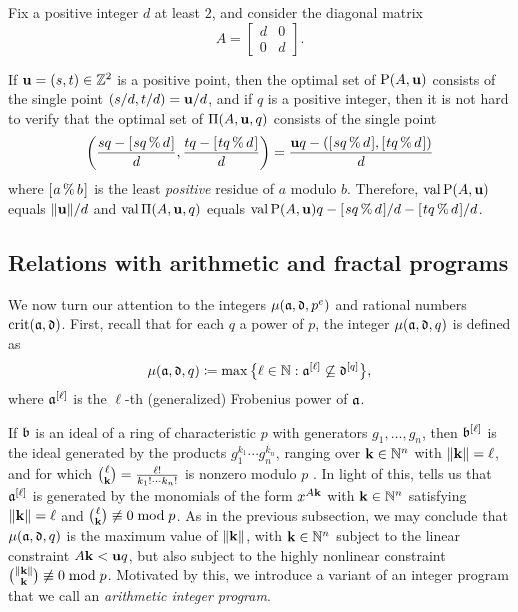 \documentclass{amsart}
\begin{document}
\begin{example}
\label{concrete-solution-to-LP-IP: E}  

Fix a positive integer $d$ at least $2$, and consider the diagonal matrix 
\[ A = \begin{bmatrix} d & 0 \\ 0 & d \end{bmatrix}. \] 

If $\mathbf{u} = (s, t) \in \mathbb{Z}^2$ is a positive point, then the optimal set of $\mathrm{P}(A,\mathbf{u})$ consists of the single point $(s/d, t/d)= \mathbf{u}/d$, and if $q$ is a positive integer, then it is not hard to verify that the optimal set of $\Pi(A, \mathbf{u}, q)$ consists of the single point
\[ \left( \frac{s q  - [ \hspace{.01in} s q \, \% \, d \hspace{.01in} ]}{d},  \frac{t q  - [ \hspace{.01in} t q \, \% \, d \hspace{.01in} ]}{d} \right) = \frac{\mathbf{u}q - ([ \hspace{.01in} sq \, \% \, d \hspace{.01in} ], [ \hspace{.01in} tq \, \% \, d \hspace{.01in} ])}{d} \] 
where $[ \hspace{.01in} a \, \% \, b \hspace{.01in} ]$ is the least \emph{positive} residue of $a$ modulo $b$.  Therefore, $\operatorname{val} \mathrm{P}(A,\mathbf{u})$ equals $\| \mathbf{u} \|/d$ and $\operatorname{val} \Pi(A,\mathbf{u},q)$ equals $\operatorname{val} \mathrm{P}(A,\mathbf{u})  q - [ \hspace{.01in} sq \, \% \, d \hspace{.01in} ]/d-[ \hspace{.01in} tq \, \% \, d \hspace{.01in} ]/d$.
\end{example}

\subsection{Relations with arithmetic and fractal programs}

We now turn our attention to the integers $\mu(\mathfrak{a}, \mathfrak{d}, p^e)$ and rational numbers $\operatorname{crit}(\mathfrak{a},\mathfrak{d})$.
First, recall that for each $q$ a power of $p$, the integer $\mu(\mathfrak{a}, \mathfrak{d}, q)$ is defined as
\[\mu(\mathfrak{a},\mathfrak{d},q) \coloneqq \max\big\{ \ell \in \mathbb{N} : \mathfrak{a}^{[\ell]} \not\subseteq \mathfrak{d}^{[q]}\big\},\]
where $\mathfrak{a}^{[\ell]}$ is the $\ell$-th (generalized) Frobenius power of $\mathfrak{a}$.

If $\mathfrak{b}$ is an ideal of a ring of characteristic $p$ with generators $g_1, \ldots, g_n$, then $\mathfrak{b}^{[\ell]}$ is the ideal generated by the products $g_1^{k_1}\cdots g_n^{k_n}$, ranging over $\mathbf{k} \in \mathbb{N}^n$ with $\| \mathbf{k} \|=\ell$, and for which  $\binom{\ell}{\mathbf{k}} =
\frac{\ell!}{k_1 ! \cdots k_n !}$ is nonzero modulo $p$  \cite[Proposition~3.5]{hernandez+etal.frobenius_powers}.
In light of this,  tells us that $\mathfrak{a}^{[\ell]}$ is generated by the monomials of the form $x^{A \mathbf{k}}$ with $\mathbf{k} \in \mathbb{N}^n$ satisfying $\| \mathbf{k} \|=\ell$ and $\binom{\ell}{\mathbf{k}} \not\equiv 0 \bmod p$.  As in the previous subsection, we may conclude that $\mu(\mathfrak{a},\mathfrak{d},q)$ is the maximum value of $\| \mathbf{k} \|$, with $\mathbf{k} \in \mathbb{N}^n$ subject to the linear constraint $A\mathbf{k} < \mathbf{u}q$, but also subject to the highly nonlinear constraint $\binom{\| \mathbf{k} \|}{\mathbf{k}} \not\equiv 0 \bmod{p}$.  Motivated by this, we introduce a variant of an integer program that we call an \emph{arithmetic integer program}.
\end{document}
